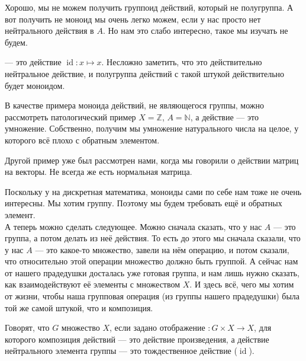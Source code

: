 \documentclass{article}
\begin{document}
\begin{itemize}
\begin{Proof}
        \end{Proof}
        \begin{Comment}
            Хорошо, мы не можем получить группоид действий, который не полугруппа. А вот получить не моноид мы очень легко можем, если у нас просто нет нейтрального действия в $A$. Но нам это слабо интересно, такое мы изучать не будем.
        \end{Comment}
        \dfn {} --- это действие $\operatorname{id}\colon x\mapsto x$.
        \thm Несложно заметить, что это действительно нейтральное действие, и полугруппа действий с такой штукой действительно будет моноидом.
        \begin{Example}
            В качестве примера моноида действий, не являющегося группы, можно рассмотреть патологический пример $X=\mathbb Z$, $A=\mathbb N$, а действие --- это умножение. Собственно, получим мы умножение натурального числа на целое, у которого всё плохо с обратным элементом.
        \end{Example}
        \begin{Example}
            Другой пример уже был рассмотрен нами, когда мы говорили о действии матриц на векторы. Не всегда же есть нормальная матрица.
        \end{Example}
        \begin{Comment}
            Поскольку у на дискретная математика, моноиды сами по себе нам тоже не очень интересны. Мы хотим группу. Поэтому мы будем требовать ещё и обратных элемент.\\
            А теперь можно сделать следующее. Можно сначала сказать, что у нас $A$ --- это группа, а потом делать из неё действия. То есть до этого мы сначала сказали, что у нас $A$ --- это какое-то множество, завели на нём операцию, и потом сказали, что относительно этой операции множество должно быть группой. А сейчас нам от нашего прадедушки досталась уже готовая группа, и нам лишь нужно сказать, как взаимодействуют её элементы с множеством $X$. И здесь всё, чего мы хотим от жизни, чтобы наша групповая операция (из группы нашего прадедушки) была той же самой штукой, что и композиция.
        \end{Comment}
        \dfn Говорят, что  $G$  множество $X$, если задано отображение $\colon G\times X\to X$, для которого композиция действий --- это действие произведения, а действие нейтрального элемента группы --- это тождественное действие ($\operatorname{id}$).
        \begin{Comment}

\end{Comment}
\end{itemize}
\end{document}
